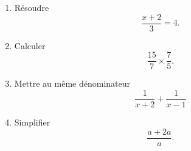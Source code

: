
\begin{exercice}\label{exoPremiere-0020}

    \begin{multicols}{2}
    \begin{enumerate}
        \item
            Résoudre
            \begin{equation}
                \frac{ x+2 }{ 3 }=4.
            \end{equation}
        \item
            Calculer
            \begin{equation}
                \frac{ 15 }{ 7 }\times \frac{ 7 }{ 5 }.
            \end{equation}
        \item
            Mettre au même dénominateur
            \begin{equation}
                \frac{1}{ x+2 }+\frac{1}{ x-1 }
            \end{equation}
        \item
            Simplifier 
            \begin{equation}
                \frac{ a+2a }{ a }.
            \end{equation}
    \end{enumerate}
    \end{multicols}

\end{exercice}
